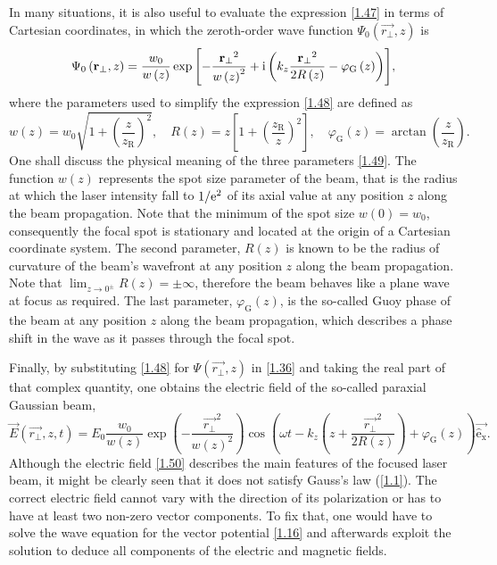 In many situations, it is also useful to evaluate the expression \ref{1.47} in terms of Cartesian coordinates, in which the zeroth-order wave function $ \Psi_0 \left(\vec{r_\bot}, z \right) $ is
\begin{equation}
\label{1.48}
\Psi_0 \left(\mathbf{r_\bot}, z \right) = \frac{w_0}{w\left(z\right)} \exp{\left[- \frac{\mathbf{r_\bot}^2}{w\left(z \right)^2} + \mathrm{i}\left( k_z \frac{\mathbf{r_\bot}^2}{2 R\left(z \right)} - \varphi_\mathrm{G} \left( z\right) \right) \right]},
\end{equation}
where the parameters used to simplify the expression \ref{1.48} are defined as
\begin{equation}
\label{1.49}
w\left(z\right) = w_0 \sqrt{1 + \left(\frac{z}{z_\mathrm{R}}\right)^2}, \quad R\left(z \right) = z \left[1 + \left(\frac{z_\mathrm{R}}{z} \right)^2\right], \quad \varphi_\mathrm{G}\left(z\right) = \arctan{\left(\frac{z}{z_\mathrm{R}}\right)}.
\end{equation}
One shall discuss the physical meaning of the three parameters \ref{1.49}. The function $ w\left(z\right) $ represents the spot size parameter of the beam, that is the radius at which the laser intensity fall to $ 1/\mathrm{e}^2 $ of its axial value at any position $ z $ along the beam propagation. Note that the minimum of the spot size $ w(0) = w_0 $, consequently the focal spot is stationary and located at the origin of a Cartesian coordinate system. The second parameter, $ R\left(z \right) $ is known to be the radius of curvature of the beam's wavefront at any position $ z $ along the beam propagation. Note that $ \lim_{z \to 0^{\pm}} R(z) = \pm \infty $, therefore the beam behaves like a plane wave at focus as required. The last parameter, $ \varphi_\mathrm{G}\left(z\right) $, is the so-called Guoy phase of the beam at any position $ z $ along the beam propagation, which describes a phase shift in the wave as it passes through the focal spot.

Finally, by substituting \ref{1.48} for $ \Psi \left(\vec{r_\bot}, z \right) $ in \ref{1.36} and taking the real part of that complex quantity, one obtains the electric field of the so-called paraxial Gaussian beam,
\begin{equation}
\label{1.50}
\vec{E}\left(\vec{r_\bot}, z, t \right) = E_0 \frac{w_0}{w(z)} \exp\left(-\frac{\vec{r_\bot}^2}{w(z)^2}\right) \cos\left(\omega t - k_z \left(z + \frac{\vec{r_\bot}^2}{2 R(z)} \right) + \varphi_\mathrm{G}\left(z\right) \right) \mathrm{\vec{\hat{e}_x}}.
\end{equation}
Although the electric field \ref{1.50} describes the main features of the focused laser beam, it might be clearly seen that it does not satisfy Gauss's law (\ref{1.1}). The correct electric field cannot vary with the direction of its polarization or has to have at least two non-zero vector components. To fix that, one would have to solve the wave equation for the vector potential \ref{1.16} and afterwards exploit the solution to deduce all components of the electric and magnetic fields.   

